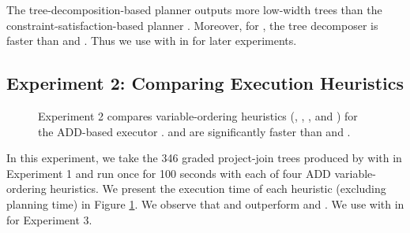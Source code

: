 The tree-decomposition-based planner \Lg{} outputs more low-width trees than the constraint-satisfaction-based planner \htb{}.
Moreover, for \Lg{}, the tree decomposer \flowcutter{} is faster than \htd{} and \tamaki{}.
Thus we use \Lg{} with \flowcutter{} in \procount{} for later experiments.


\subsection{Experiment 2: Comparing Execution Heuristics}
\begin{figure}[t]
    \centering
    
    \vspace*{-0.9cm}
    \caption{
        Experiment 2 compares variable-ordering heuristics (\mcs{}, \lexp, \lexm, and \minfill{}) for the ADD-based executor \dmc.
        \mcs{} and \lexp{} are significantly faster than \lexm{} and \minfill{}.
    }
    \label{figExecution}
\end{figure}

In this experiment, we take the 346 graded project-join trees produced by \Lg{} with \flowcutter{} in Experiment 1 %
and run \dmc{} once for 100 seconds with each of four ADD variable-ordering heuristics. 
We present the execution time of each heuristic (excluding planning time) in Figure \ref{figExecution}. 
We observe that \mcs{} and \lexp{} outperform \lexm{} and \minfill{}.
We use \dmc{} with \mcs{} in \procount{} for Experiment 3.


